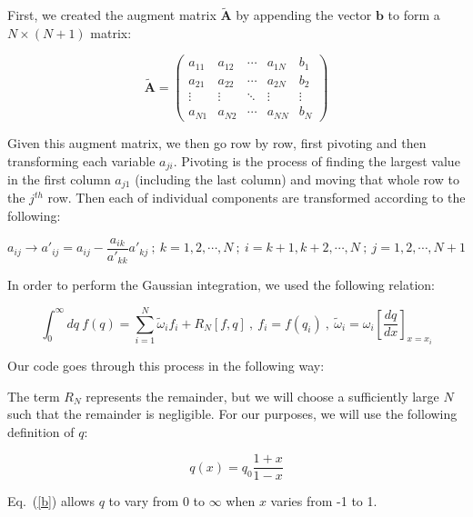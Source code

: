 \documentclass{homework}
\begin{document}
First, we created the augment matrix $\mathbf{\tilde{A}}$ by appending the vector $\mathbf{b}$ to form a $N \times (N+1)$ matrix:

\begin{equation}
\label{3}
\mathbf{\tilde{A}} =
\begin{pmatrix}
a_{11} & a_{12} & \cdots & a_{1N} & b_1 \\ a_{21} & a_{22} & \cdots & a_{2N} & b_2 \\ \vdots & \vdots & \ddots & \vdots  & \vdots \\ a_{N1} & a_{N2} & \cdots & a_{NN} & b_N
\end{pmatrix}
\end{equation}

Given this augment matrix, we then go row by row, first pivoting and then transforming each variable $a_{ji}$. Pivoting is the process of finding the largest value in the first column $a_{j1}$ (including the last column) and moving that whole row to the $j^{th}$ row. Then each of individual components are transformed according to the following:

\begin{equation}
\label{4}
a_{ij} \to a'_{ij} = a_{ij} - \frac{a_{ik}}{a'_{kk}} a'_{kj} \ ; \ k=1,2, \cdots , N \ ; \ i = k+1 , k+2 , \cdots , N \ ; \ j = 1,2, \cdots , N+1
\end{equation}

In order to perform the Gaussian integration, we used the following relation:

\begin{equation}
\label{a}
\int^{\infty}_0 dq \ f(q) = \sum^N_{i=1} \tilde{\omega}_if_i + R_N[f,q] \ , \ f_i=f(q_i) \ , \ \tilde{\omega}_i = \omega_i \left[ \frac{dq}{dx} \right]_{x=x_i}
\end{equation}

Our code goes through this process in the following way:

The term $R_N$ represents the remainder, but we will choose a sufficiently large $N$ such that the remainder is negligible. For our purposes, we will use the following definition of $q$:

\begin{equation}
\label{b}
q(x)= q_0 \frac{1+x}{1-x}
\end{equation}

Eq.~(\ref{b}) allows $q$ to vary from 0 to $\infty$ when $x$ varies from -1 to 1. 
\end{document}
